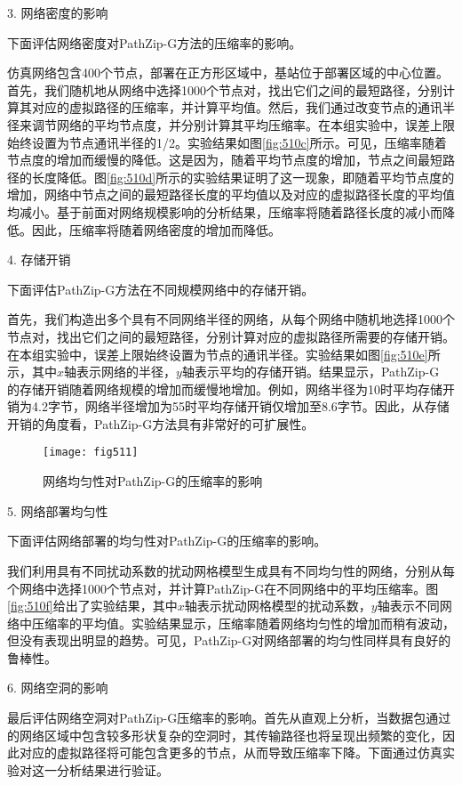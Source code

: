 3. 网络密度的影响

下面评估网络密度对PathZip-G方法的压缩率的影响。

仿真网络包含400个节点，部署在正方形区域中，基站位于部署区域的中心位置。首先，我们随机地从网络中选择1000个节点对，找出它们之间的最短路径，分别计算其对应的虚拟路径的压缩率，并计算平均值。然后，我们通过改变节点的通讯半径来调节网络的平均节点度，并分别计算其平均压缩率。在本组实验中，误差上限始终设置为节点通讯半径的1/2。实验结果如图\ref{fig:510c}所示。可见，压缩率随着节点度的增加而缓慢的降低。这是因为，随着平均节点度的增加，节点之间最短路径的长度降低。图\ref{fig:510d}所示的实验结果证明了这一现象，即随着平均节点度的增加，网络中节点之间的最短路径长度的平均值以及对应的虚拟路径长度的平均值均减小。基于前面对网络规模影响的分析结果，压缩率将随着路径长度的减小而降低。因此，压缩率将随着网络密度的增加而降低。

4. 存储开销

下面评估PathZip-G方法在不同规模网络中的存储开销。

首先，我们构造出多个具有不同网络半径的网络，从每个网络中随机地选择1000个节点对，找出它们之间的最短路径，分别计算对应的虚拟路径所需要的存储开销。在本组实验中，误差上限始终设置为节点的通讯半径。实验结果如图\ref{fig:510e}所示，其中$x$轴表示网络的半径，$y$轴表示平均的存储开销。结果显示，PathZip-G 的存储开销随着网络规模的增加而缓慢地增加。例如，网络半径为10时平均存储开销为4.2字节，网络半径增加为55时平均存储开销仅增加至8.6字节。因此，从存储开销的角度看，PathZip-G方法具有非常好的可扩展性。
\begin{figure}[h]
\centering
\texttt{[image: fig511]}
\caption{网络均匀性对PathZip-G的压缩率的影响}
\label{fig:511}
\end{figure}

5. 网络部署均匀性

下面评估网络部署的均匀性对PathZip-G的压缩率的影响。

我们利用具有不同扰动系数的扰动网格模型生成具有不同均匀性的网络，分别从每个网络中选择1000个节点对，并计算PathZip-G在不同网络中的平均压缩率。图\ref{fig:510f}给出了实验结果，其中$x$轴表示扰动网格模型的扰动系数，$y$轴表示不同网络中压缩率的平均值。实验结果显示，压缩率随着网络均匀性的增加而稍有波动，但没有表现出明显的趋势。可见，PathZip-G对网络部署的均匀性同样具有良好的鲁棒性。

6. 网络空洞的影响

最后评估网络空洞对PathZip-G压缩率的影响。首先从直观上分析，当数据包通过的网络区域中包含较多形状复杂的空洞时，其传输路径也将呈现出频繁的变化，因此对应的虚拟路径将可能包含更多的节点，从而导致压缩率下降。下面通过仿真实验对这一分析结果进行验证。


